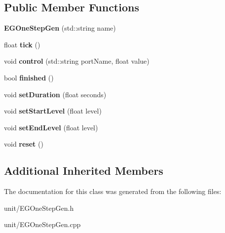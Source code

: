 \subsection*{Public Member Functions}
\begin{DoxyCompactItemize}
\item 
{\bfseries E\+G\+One\+Step\+Gen} (std\+::string name)\hypertarget{classunit_1_1EGOneStepGen_a9bc697acabed6c7b0467369ba073ede1}{}\label{classunit_1_1EGOneStepGen_a9bc697acabed6c7b0467369ba073ede1}

\item 
float {\bfseries tick} ()\hypertarget{classunit_1_1EGOneStepGen_a74df96649d7a66d19cb33bf9bf13f54a}{}\label{classunit_1_1EGOneStepGen_a74df96649d7a66d19cb33bf9bf13f54a}

\item 
void {\bfseries control} (std\+::string port\+Name, float value)\hypertarget{classunit_1_1EGOneStepGen_a8979594fb226c732a9b8232664f09047}{}\label{classunit_1_1EGOneStepGen_a8979594fb226c732a9b8232664f09047}

\item 
bool {\bfseries finished} ()\hypertarget{classunit_1_1EGOneStepGen_ae9f187e0f266559a80e4f4b534d79f78}{}\label{classunit_1_1EGOneStepGen_ae9f187e0f266559a80e4f4b534d79f78}

\item 
void {\bfseries set\+Duration} (float seconds)\hypertarget{classunit_1_1EGOneStepGen_aaf02138e168cad06cb955944f57ce93c}{}\label{classunit_1_1EGOneStepGen_aaf02138e168cad06cb955944f57ce93c}

\item 
void {\bfseries set\+Start\+Level} (float level)\hypertarget{classunit_1_1EGOneStepGen_af2b5bd8522fac9dc997d78d3750cdbbb}{}\label{classunit_1_1EGOneStepGen_af2b5bd8522fac9dc997d78d3750cdbbb}

\item 
void {\bfseries set\+End\+Level} (float level)\hypertarget{classunit_1_1EGOneStepGen_a3d58403aa5bebffeaf3f326855e0a233}{}\label{classunit_1_1EGOneStepGen_a3d58403aa5bebffeaf3f326855e0a233}

\item 
void {\bfseries reset} ()\hypertarget{classunit_1_1EGOneStepGen_a4898b08a0687e03802abdb7945708cab}{}\label{classunit_1_1EGOneStepGen_a4898b08a0687e03802abdb7945708cab}

\end{DoxyCompactItemize}
\subsection*{Additional Inherited Members}


The documentation for this class was generated from the following files\+:\begin{DoxyCompactItemize}
\item 
unit/E\+G\+One\+Step\+Gen.\+h\item 
unit/E\+G\+One\+Step\+Gen.\+cpp\end{DoxyCompactItemize}
